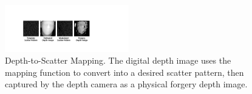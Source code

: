 


\begin{figure}[!t]
	\centering
	\includegraphics[width=0.48\textwidth]{figures/depth_mapping_1.pdf} 
	\vspace{-0.15in}
	\caption{Depth-to-Scatter Mapping. The digital depth image uses the mapping function to convert into a desired scatter pattern, then captured by the depth camera as a physical forgery depth image.}
	\label{depth_mapping}
	\vspace{-0.15in}
\end{figure}


